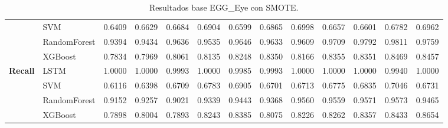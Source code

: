 \begin{table}[h]
\begin{adjustbox}{max width=15cm}
\begin{tabular}{|c|l|r|r|r|r|r|r|r|r|r|r|r|}
			& SVM &  0.6409 &  0.6629 &  0.6684 &  0.6904 &  0.6599 &  0.6865 &  0.6998 &  0.6657 &  0.6601 &  0.6782 &  0.6962 \\
			& RandomForest &  0.9394 &  0.9434 &  0.9636 &  0.9535 &  0.9646 &  0.9633 &  0.9609 &  0.9709 &  0.9792 &  0.9811 &  0.9759 \\
			& XGBoost &  0.7834 &  0.7969 &  0.8061 &  0.8135 &  0.8248 &  0.8350 &  0.8166 &  0.8355 &  0.8351 &  0.8469 &  0.8457 \\
			\hline
			\textbf{Recall} & LSTM &  1.0000 &  1.0000 &  0.9993 &  1.0000 &  0.9985 &  0.9993 &  1.0000 &  1.0000 &  1.0000 &  0.9940 &  1.0000 \\
			& SVM &  0.6116 &  0.6398 &  0.6709 &  0.6783 &  0.6905 &  0.6701 &  0.6713 &  0.6775 &  0.6835 &  0.7046 &  0.6731 \\
			& RandomForest &  0.9152 &  0.9257 &  0.9021 &  0.9339 &  0.9443 &  0.9368 &  0.9560 &  0.9559 &  0.9571 &  0.9573 &  0.9465 \\
			& XGBoost &  0.7898 &  0.8004 &  0.7893 &  0.8243 &  0.8385 &  0.8075 &  0.8226 &  0.8262 &  0.8357 &  0.8433 &  0.8654 \\
			\hline
		\end{tabular}
	\end{adjustbox}
	\label{tab:EGGEyeSMOTE}
	\caption{Resultados base EGG\_Eye con SMOTE.}
\end{table}
\newpage
